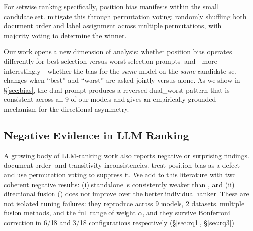 For setwise ranking specifically, position bias manifests within the small candidate set. \citet{zhuang2024setwise} mitigate this through permutation voting: randomly shuffling both document order and label assignment across multiple permutations, with majority voting to determine the winner.

Our work opens a new dimension of analysis: whether position bias operates differently for best-selection versus worst-selection prompts, and---more interestingly---whether the bias for the \emph{same} model on the \emph{same} candidate set changes when ``best'' and ``worst'' are asked jointly versus alone. As we show in \S\ref{sec:bias}, the dual prompt produces a reversed dual\_worst pattern that is consistent across all 9 of our models and gives an empirically grounded mechanism for the directional asymmetry.

\subsection{Negative Evidence in LLM Ranking}

A growing body of LLM-ranking work also reports negative or surprising findings. \citet{zeng2024llmrankfusion} document order- and transitivity-inconsistencies. \citet{tang2024found} treat position bias as a defect and use permutation voting to suppress it. We add to this literature with two coherent negative results: (i) standalone \bottomup{} is consistently weaker than \topdown{}, and (ii) directional fusion (\bidir{}) does not improve over the better individual ranker. These are not isolated tuning failures: they reproduce across 9 models, 2 datasets, multiple fusion methods, and the full range of weight $\alpha$, and they survive Bonferroni correction in 6/18 and 3/18 configurations respectively (\S\ref{sec:rq1}, \S\ref{sec:rq3}).
